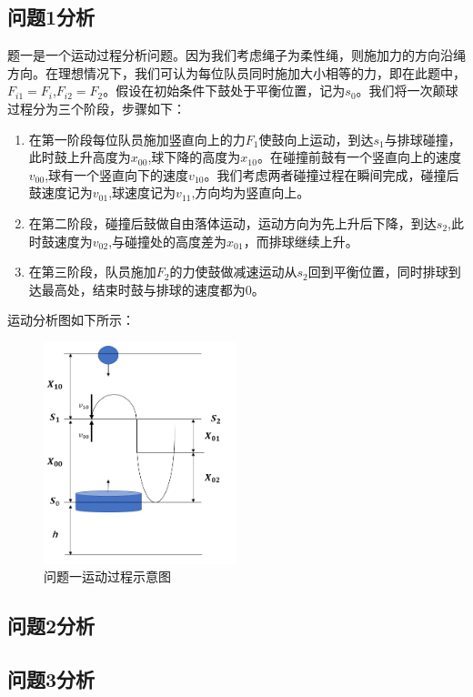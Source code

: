 \documentclass{cumcm}
\begin{document}
\subsection{问题1分析}
题一是一个运动过程分析问题。因为我们考虑绳子为柔性绳，则施加力的方向沿绳方向。在理想情况下，我们可认为每位队员同时施加大小相等的力，即在此题中，$F_{i1}=F_i$,$F_{i2}=F_2$。假设在初始条件下鼓处于平衡位置，记为$s_0$。我们将一次颠球过程分为三个阶段，步骤如下：
\begin{enumerate}
\item 在第一阶段每位队员施加竖直向上的力$F_1$使鼓向上运动，到达$s_1$与排球碰撞，此时鼓上升高度为$x_{00}$,球下降的高度为$x_{10}$。在碰撞前鼓有一个竖直向上的速度$v_{00}$,球有一个竖直向下的速度$v_{10}$。我们考虑两者碰撞过程在瞬间完成，碰撞后鼓速度记为$v_{01}$,球速度记为$v_{11}$,方向均为竖直向上。
\item 在第二阶段，碰撞后鼓做自由落体运动，运动方向为先上升后下降，到达$s_2$,此时鼓速度为$v_{02}$,与碰撞处的高度差为$x_{01}$，而排球继续上升。
\item 在第三阶段，队员施加$F_2$的力使鼓做减速运动从$s_2$回到平衡位置，同时排球到达最高处，结束时鼓与排球的速度都为$0$。
\end{enumerate}
运动分析图如下所示：
\begin{figure}[H]
\centering
\includegraphics[width=0.5\textwidth]{img/question1.png}
\caption{问题一运动过程示意图}\label{fig-buoy}
\end{figure}

\subsection{问题2分析}
\subsection{问题3分析}
\end{document}
